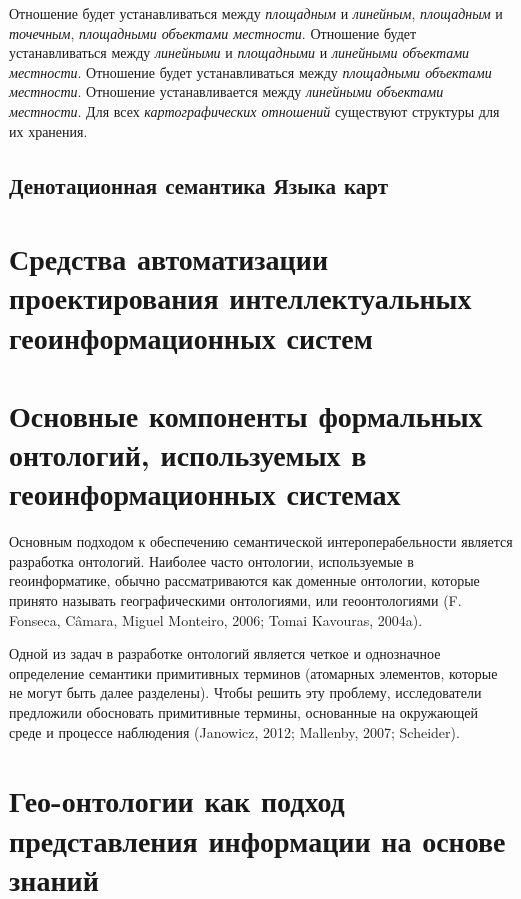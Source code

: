 Отношение  будет устанавливаться между \textit{площадным} и \textit{линейным}, \textit{площадным} и \textit{точечным}, \textit{площадными объектами местности}. Отношение  будет устанавливаться между \textit{линейными} и \textit{площадными} и \textit{линейными объектами местности}. Отношение  будет устанавливаться между \textit{площадными объектами местности}. Отношение  устанавливается между \textit{линейными объектами местности}. Для всех \textit{картографических отношений} существуют структуры для их хранения.

\subsection{Денотационная семантика Языка карт}
\label{chapter_gis_sec_map_semantics}

\section{Средства автоматизации проектирования интеллектуальных геоинформационных систем}
\label{chapter_gis_sec_automatization}

\section{Основные компоненты формальных онтологий, используемых в геоинформационных системах}

Основным подходом к обеспечению семантической интероперабельности является разработка онтологий.
Наиболее часто онтологии, используемые в геоинформатике, обычно рассматриваются как доменные онтологии, которые принято называть  географическими онтологиями, или геоонтологиями (F. Fonseca, Câmara, Miguel Monteiro, 2006; Tomai  Kavouras, 2004a). 

Одной из задач в разработке онтологий является четкое и однозначное определение семантики примитивных терминов (атомарных элементов, которые не могут быть далее разделены). Чтобы решить эту проблему, исследователи предложили обосновать примитивные термины, основанные на окружающей среде и процессе наблюдения (Janowicz, 2012; Mallenby, 2007; Scheider).

\section{Гео-онтологии как подход представления информации на основе знаний}

